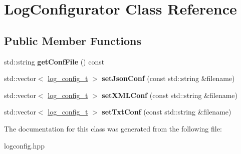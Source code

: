 \hypertarget{classLogConfigurator}{}\section{Log\+Configurator Class Reference}
\label{classLogConfigurator}
\subsection*{Public Member Functions}
\begin{DoxyCompactItemize}
\item 
\mbox{\label{classLogConfigurator_a405647d7659f2d3328ba2e44741badf9}} 
std\+::string {\bfseries get\+Conf\+File} () const
\item 
\mbox{\label{classLogConfigurator_a1788c9dfafd90c5c233cb1d1da3b1f5c}} 
std\+::vector$<$ \hyperlink{structLogConfigStruct}{log\+\_\+config\+\_\+t} $>$ {\bfseries set\+Json\+Conf} (const std\+::string \&filename)
\item 
\mbox{\label{classLogConfigurator_a44e15e8f6e941e409ad7dd5e482ab953}} 
std\+::vector$<$ \hyperlink{structLogConfigStruct}{log\+\_\+config\+\_\+t} $>$ {\bfseries set\+X\+M\+L\+Conf} (const std\+::string \&filename)
\item 
\mbox{\label{classLogConfigurator_a4cb0ad5e44287994ac9302f6bb64e3cd}} 
std\+::vector$<$ \hyperlink{structLogConfigStruct}{log\+\_\+config\+\_\+t} $>$ {\bfseries set\+Txt\+Conf} (const std\+::string \&filename)
\end{DoxyCompactItemize}


The documentation for this class was generated from the following file\+:\begin{DoxyCompactItemize}
\item 
logconfig.\+hpp\end{DoxyCompactItemize}
